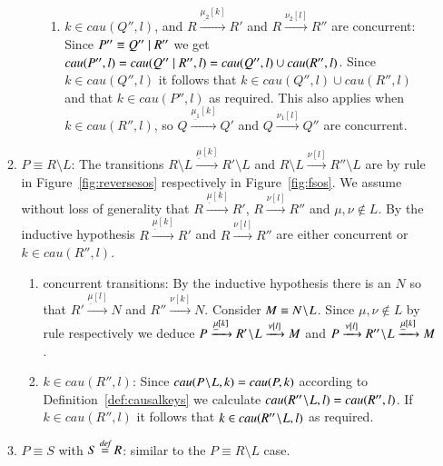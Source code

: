 \begin{subappendices}
\begin{pf}
\begin{enumerate}
\begin{enumerate}
\begin{enumerate}
\begin{enumerate}
\item $k \in cau(Q'',l)$, and $R\xrightarrow{\underline{\mu_2}[k]} R'$ and $R \xrightarrow{\nu_2[l]} R''$ are concurrent: Since $P''\equiv Q'' \; \vert \; R''$ we get $cau(P'',l)=cau(Q'' \; \vert \; R'',l)=cau(Q'',l) \cup cau(R'',l)$. Since $k \in cau(Q'',l)$ it follows that $k \in cau(Q'',l) \cup cau(R'',l)$ and  that $k \in cau(P'',l)$ as required. This also applies when $k \in cau(R'',l)$, so 
$Q \xrightarrow{\underline{\mu_1}[k]} Q'$ and $Q \xrightarrow{\nu_1[l]} Q''$ are concurrent.
\end{enumerate}
\end{enumerate}
\item $P\equiv R \setminus L$:
	The transitions $R \setminus L \xrightarrow{\underline{\mu}[k]} R' \setminus L$ and $R \setminus L \xrightarrow{\nu[l]} R'' \setminus L$ are by rule  in Figure~\ref{fig:reversesos} respectively  in Figure~\ref{fig:fsos}. We assume without loss of generality that $R \xrightarrow{\underline{\mu}[k]} R'$, $R \xrightarrow{\nu[l]} R''$ and $\mu, \nu \notin L$. By the inductive hypothesis 
$R \xrightarrow{\underline{\mu}[k]} R'$ and $R \xrightarrow{\nu[l]} R''$ are either concurrent or 
$k \in cau(R'',l)$.
\begin{enumerate}
	\item concurrent transitions: By the inductive hypothesis there is an $N$ so that $R' \xrightarrow{\underline{\mu}[l]} N$ and $R'' \xrightarrow{\nu[k]} N$. Consider $M \equiv N \!\setminus\!L$. Since $\mu, \nu \notin L$ by rule  respectively  we deduce $P\xrightarrow{\underline{\mu}[k]} R' \!\setminus\!L \xrightarrow{\nu[l]} M$ and $P\xrightarrow{\nu[l]} R'' \!\setminus\!L \xrightarrow{\underline{\mu}[k]} M$.
\item $k \in cau(R'',l)$: Since $cau(P \!\setminus\!L, k) = cau(P, k)$ according to Definition~\ref{def:causalkeys} we calculate $cau(R'' \!\setminus\!L,l)=cau(R'',l)$. If $k \in cau(R'',l)$ it follows that $k \in cau(R'' \!\setminus\!L,l)$ as required.
\end{enumerate}
\item $P \equiv S$ with $S\stackrel{\emph{def}}{=} R$: similar to the $P\equiv R \setminus L$ case.
\end{enumerate}
\end{enumerate}
\end{pf}
\end{subappendices}
